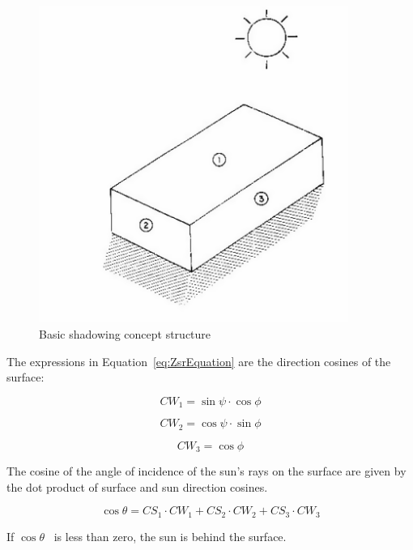 \begin{figure}[hbtp] %
\centering
\includegraphics[width=0.9\textwidth, height=0.9\textheight, keepaspectratio=true]{media/image622.png}
\caption{Basic shadowing concept structure \protect \label{fig:basic-shadowing-concept-structure}}
\end{figure}

The expressions in Equation~\ref{eq:ZsrEquation} are the direction cosines of the surface:

\begin{equation}
C{W_1} = \sin \psi \cdot \cos \phi
\end{equation}

\begin{equation}
C{W_2} = \cos \psi \cdot \sin \phi
\end{equation}

\begin{equation}
C{W_3} = \cos \phi
\end{equation}

The cosine of the angle of incidence of the sun's rays on the surface are given by the dot product of surface and sun direction cosines.

\begin{equation}
\cos \theta  = C{S_1}\cdot C{W_1} + C{S_2}\cdot C{W_2} + C{S_3}\cdot C{W_3}
\end{equation}

If \(\cos \theta\) ~is less than zero, the sun is behind the surface.


